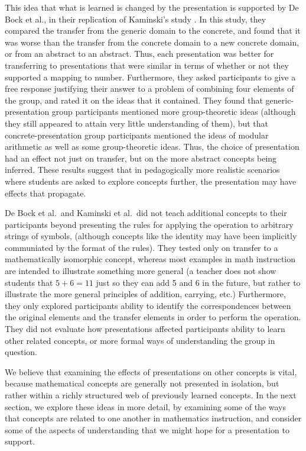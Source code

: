 \documentclass[man,10pt]{apa6}
\begin{document}
This idea that what is learned is changed by the presentation is supported by De Bock et al., in their replication of Kaminski's study \cite{DeBock2011}. In this study, they compared the transfer from the generic domain to the concrete, and found that it was worse than the transfer from the concrete domain to a new concrete domain, or from an abstract to an abstract. Thus, each presentation was better for transferring to presentations that were similar in terms of whether or not they supported a mapping to number. Furthermore, they asked participants to give a free response justifying their answer to a problem of combining four elements of the group, and rated it on the ideas that it contained. They found that generic-presentation group participants mentioned more group-theoretic ideas (although they still appeared to attain very little understanding of them), but that concrete-presentation group participants mentioned the ideas of modular arithmetic as well as some group-theoretic ideas. Thus, the choice of presentation had an effect not just on transfer, but on the more abstract concepts being inferred. These results suggest that in pedagogically more realistic scenarios where students are asked to explore concepts further, the presentation may have effects that propagate. \par
De Bock et al.\ and Kaminski et al.\ did not teach additional concepts to their participants beyond presenting the rules for applying the operation to arbitrary strings of symbols, (although concepts like the identity may have been implicitly communiated by the format of the rules). They tested only on transfer to a mathematically isomorphic concept, whereas most examples in math instruction are intended to illustrate something more general (a teacher does not show students that $5+6 = 11$ just so they can add 5 and 6 in the future, but rather to illustrate the more general principles of addition, carrying, etc.) Furthermore, they only explored participants ability to identify the correspondences between the original elements and the transfer elements in order to perform the operation. They did not evaluate how presentations affected participants ability to learn other related concepts, or more formal ways of understanding the group in question.\par
We believe that examining the effects of presentations on other concepts is vital, because mathematical concepts are generally not presented in isolation, but rather within a richly structured web of previously learned concepts. In the next section, we explore these ideas in more detail, by examining some of the ways that concepts are related to one another in mathematics instruction, and consider some of the aspects of understanding that we might hope for a presentation to support. 
\end{document}
